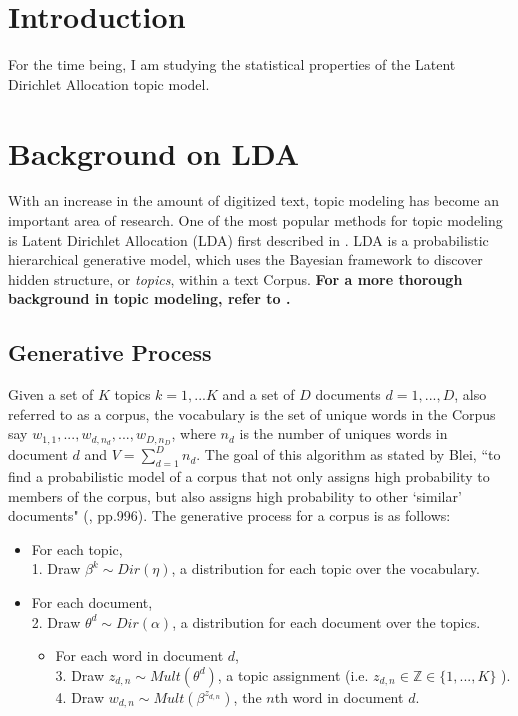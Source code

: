 \documentclass[3p,times]{elsarticle}
\begin{document}




\section{Introduction}
For the time being, I am studying the statistical properties of the Latent Dirichlet Allocation topic model.

\section{Background on LDA}
\noindent With an increase in the amount of digitized text, topic modeling has become an important area of research. One of the most popular methods for topic modeling is Latent Dirichlet Allocation (LDA) first described in \cite{lda}. LDA is a probabilistic hierarchical generative model, which uses the Bayesian framework to discover hidden structure, or \textit{topics},  within a text Corpus. \textbf{For a more thorough background in topic modeling, refer to \cite{news}.}

\subsection{Generative Process}
\noindent Given a set of $K$ topics $k=1,...K$ and a set of $D$ documents $d=1,...,D$, also referred to as a corpus, the vocabulary is the set of unique words in the Corpus say $w_{1,1},...,w_{d,n_{d}},...,w_{D,n_{D}}$, where $n_{d}$ is the number of uniques words in document $d$ and $V=\sum_{d=1}^{D}{n_{d}}$. The goal of this algorithm as stated by Blei, ``to find a probabilistic model of a corpus that not only assigns high probability to members of the corpus, but also assigns high probability to other `similar' documents" (\cite{lda}, pp.996). The generative process for a corpus is as follows:
\begin{itemize}
	\item For each topic, \\
	1. Draw $\beta^{k} \sim Dir(\eta)$, a distribution for each topic over the vocabulary.
	
	\item For each document, \\
	2. Draw $\theta^{d} \sim Dir(\alpha)$, a distribution for each document over the topics.	
		\begin{itemize}
		\item For each word in document $d$, \\
		3. Draw $z_{d,n} \sim Mult(\theta^{d})$, a topic assignment (i.e. $z_{d,n} \in \mathbb{Z} \in \{1,...,K\}$ ). \\
		4. Draw $w_{d,n} \sim Mult(\beta^{z_{d,n}})$, the $n$th word in document $d$.
	\end{itemize}
\end{itemize}
\end{document}
